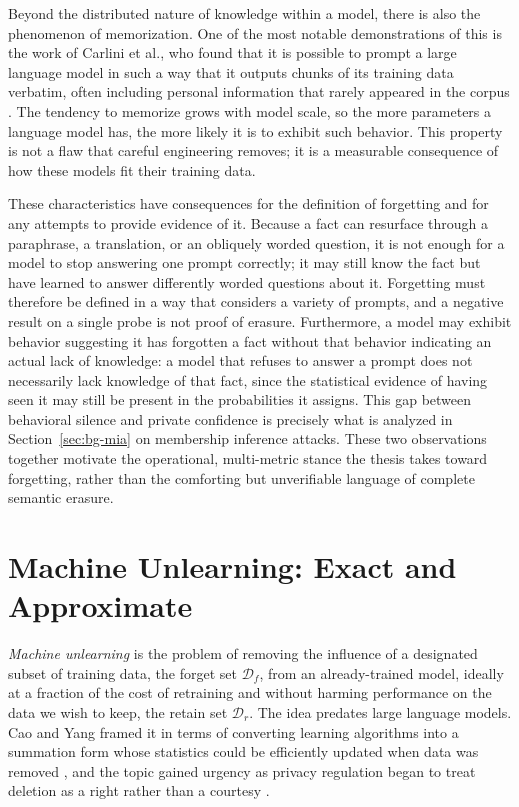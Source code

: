 \documentclass[a4paper,12pt]{report}
\begin{document}
Beyond the distributed nature of knowledge within a model, there is also the phenomenon of memorization. One of the most notable demonstrations of this is the work of Carlini et al., who found that it is possible to prompt a large language model in such a way that it outputs chunks of its training data verbatim, often including personal information that rarely appeared in the corpus \parencite{carlini2021extracting}. The tendency to memorize grows with model scale, so the more parameters a language model has, the more likely it is to exhibit such behavior. This property is not a flaw that careful engineering removes; it is a measurable consequence of how these models fit their training data.

These characteristics have consequences for the definition of forgetting and for any attempts to provide evidence of it. Because a fact can resurface through a paraphrase, a translation, or an obliquely worded question, it is not enough for a model to stop answering one prompt correctly; it may still know the fact but have learned to answer differently worded questions about it. Forgetting must therefore be defined in a way that considers a variety of prompts, and a negative result on a single probe is not proof of erasure. Furthermore, a model may exhibit behavior suggesting it has forgotten a fact without that behavior indicating an actual lack of knowledge: a model that refuses to answer a prompt does not necessarily lack knowledge of that fact, since the statistical evidence of having seen it may still be present in the probabilities it assigns. This gap between behavioral silence and private confidence is precisely what is analyzed in Section~\ref{sec:bg-mia} on membership inference attacks. These two observations together motivate the operational, multi-metric stance the thesis takes toward forgetting, rather than the comforting but unverifiable language of complete semantic erasure.

\section{Machine Unlearning: Exact and Approximate}
\emph{Machine unlearning} is the problem of removing the influence of a designated subset of training data, the forget set $\mathcal{D}_f$, from an already-trained model, ideally at a fraction of the cost of retraining and without harming performance on the data we wish to keep, the retain set $\mathcal{D}_r$. The idea predates large language models. Cao and Yang framed it in terms of converting learning algorithms into a summation form whose statistics could be efficiently updated when data was removed \parencite{cao2015unlearning}, and the topic gained urgency as privacy regulation began to treat deletion as a right rather than a courtesy \parencite{gdpr2016}.
\end{document}
